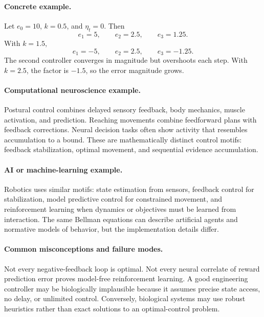\paragraph{Concrete example.}
Let \(e_0=10\), \(k=0.5\), and \(\eta_t=0\). Then
\[
e_1=5,\qquad e_2=2.5,\qquad e_3=1.25.
\]
With \(k=1.5\),
\[
e_1=-5,\qquad e_2=2.5,\qquad e_3=-1.25.
\]
The second controller converges in magnitude but overshoots each step. With \(k=2.5\), the factor is \(-1.5\), so the error magnitude grows.

\paragraph{Computational neuroscience example.}
Postural control combines delayed sensory feedback, body mechanics, muscle activation, and prediction. Reaching movements combine feedforward plans with feedback corrections. Neural decision tasks often show activity that resembles accumulation to a bound. These are mathematically distinct control motifs: feedback stabilization, optimal movement, and sequential evidence accumulation.

\paragraph{AI or machine-learning example.}
Robotics uses similar motifs: state estimation from sensors, feedback control for stabilization, model predictive control for constrained movement, and reinforcement learning when dynamics or objectives must be learned from interaction. The same Bellman equations can describe artificial agents and normative models of behavior, but the implementation details differ.

\paragraph{Common misconceptions and failure modes.}
Not every negative-feedback loop is optimal. Not every neural correlate of reward prediction error proves model-free reinforcement learning. A good engineering controller may be biologically implausible because it assumes precise state access, no delay, or unlimited control. Conversely, biological systems may use robust heuristics rather than exact solutions to an optimal-control problem.

